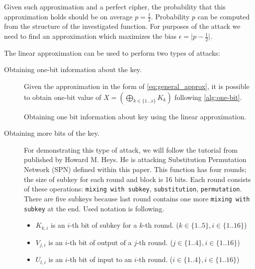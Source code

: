\documentclass[
    digital,    %
    oneside,    %
    color,
    11pt,
    nocover,
    notable,
    nolof,
    nolot,
    final
]{fithesis3}
\renewcommand\_{\textunderscore\allowbreak}
\begin{document}
Given such approximation and a perfect cipher, the probability that this approximation holds should be on average $p = \frac{1}{2}$. Probability $p$ can be computed from the structure of the investigated function. For purposes of the attack we need to find an approximation which maximizes the bias $\epsilon = \lvert p - \frac{1}{2} \rvert$. 

The linear approximation can be used to perform two types of attacks:

\begin{description}
	\item[Obtaining one-bit information about the key.] Given the approximation in the form of \cref{eq:general_approx}, it is possible to obtain one-bit value of $X = \left( \bigoplus_{k \in \{1...s\}} K_{k} \right)$ following \cref{alg:one-bit}. \cite{junod2000linear}
	
	\begin{algorithm}[H]

		
		\caption{Obtaining one bit information about key using the linear approximation.} 
		\label{alg:one-bit}
	\end{algorithm}
	
	\item[Obtaining more bits of the key.] For demonstrating this type of attack, we will follow the tutorial from \cite{human-cryptanalysis} published by Howard M. Heys. He is attacking Substitution Permutation Network (SPN) defined within this paper. This function has four rounds; the size of subkey for each round and block is 16 bits. Each round consists of these operations: \texttt{mixing with subkey}, \texttt{substitution}, \texttt{permutation}. There are five subkeys because last round contains one more \texttt{mixing with subkey} at the end. Used notation is following.
	
	\begin{itemize}
		\item $K_{k,i}$ is an $i$-th bit of subkey for a $k$-th round. ($k \in \{1..5\}, i \in \{1..16\}$)
		\item $V_{j,i}$ is an $i$-th bit of output of a $j$-th round. ($j \in \{1..4\}, i \in \{1..16\}$)
		\item $U_{l,i}$ is an $i$-th bit of input to an $i$-th round. ($i \in \{1..4\}, i \in \{1..16\}$)
		

\end{itemize}
\end{description}
\end{document}
